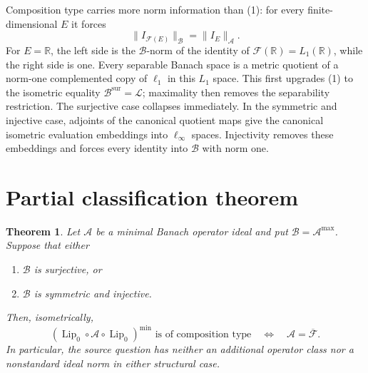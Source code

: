 \documentclass[11pt]{article}
\newtheorem{theorem}{Theorem}
\newcommand{\Lip}{\operatorname{Lip}_0}
\newcommand{\OF}{\overline{\mathcal F}}
\newcommand{\Lop}{\mathcal L}
\newcommand{\A}{\mathcal A}
\newcommand{\B}{\mathcal B}
\begin{document}
Composition type carries more norm information than (1): for every
finite-dimensional $E$ it forces
\[
 \|I_{\mathcal F(E)}\|_{\B}=\|I_E\|_{\A}. \tag{2}
\]
For $E=\mathbb R$, the left side is the $\B$-norm of the identity of
$\mathcal F(\mathbb R)=L_1(\mathbb R)$, while the right side is one. Every
separable Banach space is a metric quotient of a norm-one complemented copy
of $\ell_1$ in this $L_1$ space. This first upgrades (1) to the isometric
equality $\B^{\mathrm{sur}}=\Lop$; maximality then removes the separability
restriction. The surjective case collapses immediately. In the symmetric and
injective case, adjoints of the canonical quotient maps give the canonical
isometric evaluation embeddings into $\ell_\infty$ spaces. Injectivity removes
these embeddings and forces every identity into $\B$ with norm one.

\section{Partial classification theorem}

\begin{theorem}
Let $\A$ be a minimal Banach operator ideal and put $\B=\A^{\max}$. Suppose
that either
\begin{enumerate}
  \item $\B$ is surjective, or
  \item $\B$ is symmetric and injective.
\end{enumerate}
Then, isometrically,
\[
 (\Lip\circ\A\circ\Lip)^{\min}
 \text{ is of composition type}
 \quad\Longleftrightarrow\quad
 \A=\OF .
\]
In particular, the source question has neither an additional operator class
nor a nonstandard ideal norm in either structural case.
\end{theorem}
\end{document}
